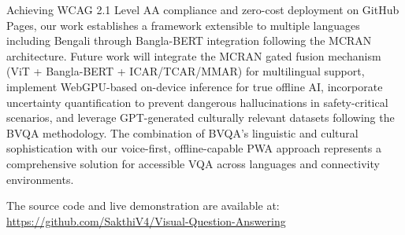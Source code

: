\documentclass[conference]{IEEEtran}
\begin{document}
Achieving WCAG 2.1 Level AA compliance and zero-cost deployment on GitHub Pages, our work establishes a framework extensible to multiple languages including Bengali through Bangla-BERT integration following the MCRAN architecture. Future work will integrate the MCRAN gated fusion mechanism (ViT + Bangla-BERT + ICAR/TCAR/MMAR) for multilingual support, implement WebGPU-based on-device inference for true offline AI, incorporate uncertainty quantification to prevent dangerous hallucinations in safety-critical scenarios, and leverage GPT-generated culturally relevant datasets following the BVQA methodology. The combination of BVQA's linguistic and cultural sophistication with our voice-first, offline-capable PWA approach represents a comprehensive solution for accessible VQA across languages and connectivity environments.

The source code and live demonstration are available at: \url{https://github.com/SakthiV4/Visual-Question-Answering}
\end{document}
